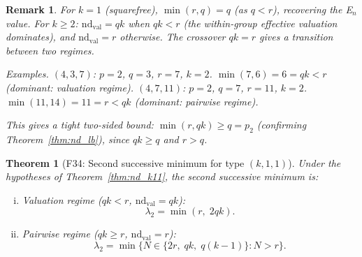 \documentclass[12pt]{article}
\newtheorem{theorem}{Theorem}
\newtheorem{remark}{Remark}
\theoremstyle{definition}
\begin{document}
\begin{remark}
  For $k = 1$ (squarefree), $\min(r, q) = q$ (as $q < r$), recovering the E$_n$ value.
  For $k \ge 2$: $\mathrm{nd}_{\mathrm{val}} = qk$ when $qk < r$
  (the within-group effective valuation dominates), and $\mathrm{nd}_{\mathrm{val}} = r$ otherwise.
  The crossover $qk = r$ gives a transition between two regimes.

  \textit{Examples.}  $(4, 3, 7)$: $p=2$, $q=3$, $r=7$, $k=2$.
  $\min(7, 6) = 6 = qk < r$ (dominant: valuation regime).
  $(4, 7, 11)$: $p=2$, $q=7$, $r=11$, $k=2$.
  $\min(11, 14) = 11 = r < qk$ (dominant: pairwise regime).

  This gives a tight two-sided bound: $\min(r, qk) \ge q = p_2$
  (confirming Theorem~\ref{thm:nd_lb}), since $qk \ge q$ and $r > q$.
\end{remark}

\begin{theorem}[F34: Second successive minimum for type $(k,1,1)$]\label{thm:f34}
  Under the hypotheses of Theorem~\ref{thm:nd_k11}, the second successive minimum is:
  \begin{enumerate}[(i)]
    \item \textit{Valuation regime} ($qk < r$, $\mathrm{nd}_{\mathrm{val}} = qk$):
      \[
        \lambda_2 = \min(r,\; 2qk).
      \]
    \item \textit{Pairwise regime} ($qk \ge r$, $\mathrm{nd}_{\mathrm{val}} = r$):
      \[
        \lambda_2 = \min\bigl\{ N \in \{2r,\; qk,\; q(k-1)\} : N > r \bigr\}.
      \]
  \end{enumerate}
\end{theorem}
\end{document}
